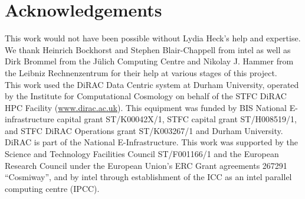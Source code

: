 \documentclass{sig-alternate-05-2015}
\begin{document}
\section{Acknowledgements}
This work would not have been possible without Lydia Heck's help and
expertise. We thank Heinrich Bockhorst and Stephen Blair-Chappell from
{\sc intel} as well as Dirk Brommel from the J\"ulich Computing Centre
and Nikolay J. Hammer from the Leibniz Rechnenzentrum for their help
at various stages of this project.\\ This work used the DiRAC Data
Centric system at Durham University, operated by the Institute for
Computational Cosmology on behalf of the STFC DiRAC HPC Facility
(\url{www.dirac.ac.uk}). This equipment was funded by BIS National
E-infrastructure capital grant ST/K00042X/1, STFC capital grant
ST/H008519/1, and STFC DiRAC Operations grant ST/K003267/1 and Durham
University. DiRAC is part of the National E-Infrastructure. This work
was supported by the Science and Technology Facilities Council
ST/F001166/1 and the European Research Council under the European
Union's ERC Grant agreements 267291 ``Cosmiway'', and by {\sc intel}
through establishment of the ICC as an {\sc intel} parallel computing
centre (IPCC).

\nocite{*}


\end{document}
